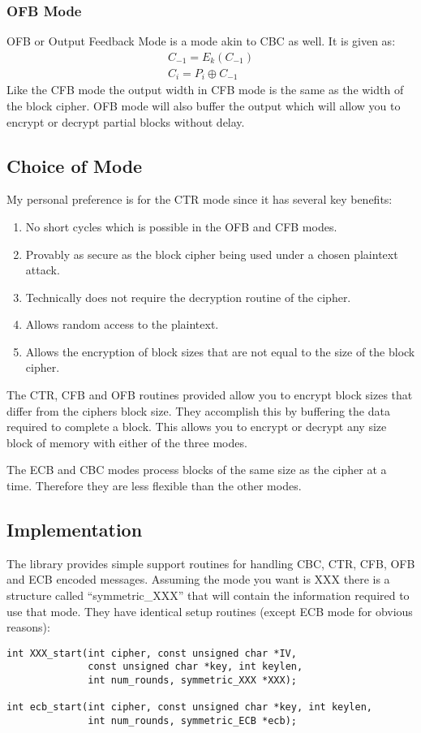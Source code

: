 \documentclass{book}
\begin{document}
\subsubsection{OFB Mode}
OFB or Output Feedback Mode is a mode akin to CBC as well.  It is given as:
\begin{eqnarray}
C_{-1} = E_k(C_{-1}) \nonumber \\
C_i = P_i \oplus C_{-1}
\end{eqnarray}
Like the CFB mode the output width in CFB mode is the same as the width of the block cipher.  OFB mode will also
buffer the output which will allow you to encrypt or decrypt partial blocks without delay.

\subsection{Choice of Mode}
My personal preference is for the CTR mode since it has several key benefits:
\begin{enumerate}
   \item No short cycles which is possible in the OFB and CFB modes.
   \item Provably as secure as the block cipher being used under a chosen plaintext attack.
   \item Technically does not require the decryption routine of the cipher.
   \item Allows random access to the plaintext.
   \item Allows the encryption of block sizes that are not equal to the size of the block cipher.
\end{enumerate}
The CTR, CFB and OFB routines provided allow you to encrypt block sizes that differ from the ciphers block size.  They 
accomplish this by buffering the data required to complete a block.  This allows you to encrypt or decrypt any size 
block of memory with either of the three modes.

The ECB and CBC modes process blocks of the same size as the cipher at a time.  Therefore they are less flexible than the
other modes.

\subsection{Implementation}
 
 
The library provides simple support routines for handling CBC, CTR, CFB, OFB and ECB encoded messages.  Assuming the mode 
you want is XXX there is a structure called ``symmetric\_XXX'' that will contain the information required to
use that mode.  They have identical setup routines (except ECB mode for obvious reasons):
\begin{verbatim}
int XXX_start(int cipher, const unsigned char *IV, 
              const unsigned char *key, int keylen, 
              int num_rounds, symmetric_XXX *XXX);

int ecb_start(int cipher, const unsigned char *key, int keylen, 
              int num_rounds, symmetric_ECB *ecb);
\end{verbatim}
\end{document}

